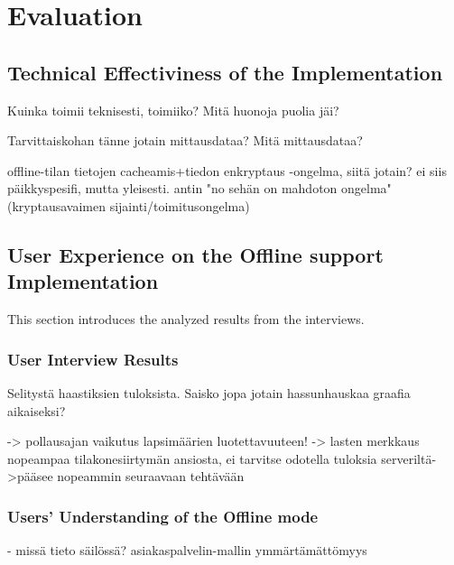 \chapter{Evaluation}


\section{Technical Effectiviness of the Implementation}


Kuinka toimii teknisesti, toimiiko? Mitä huonoja puolia jäi?

Tarvittaiskohan tänne jotain mittausdataa? Mitä mittausdataa?

offline-tilan tietojen cacheamis+tiedon enkryptaus -ongelma, siitä jotain? ei siis päikkyspesifi, mutta yleisesti. antin "no sehän on mahdoton ongelma" (kryptausavaimen sijainti/toimitusongelma)
 



\section{User Experience on the Offline support Implementation}

This section introduces the analyzed results from the interviews. 


\subsection{User Interview Results}
Selitystä haastiksien tuloksista. Saisko jopa jotain hassunhauskaa graafia aikaiseksi?

-> pollausajan vaikutus lapsimäärien luotettavuuteen!
-> lasten merkkaus nopeampaa tilakonesiirtymän ansiosta, ei tarvitse odotella tuloksia serveriltä->pääsee nopeammin seuraavaan tehtävään

\subsection{Users' Understanding of the Offline mode}
- missä tieto säilössä? asiakaspalvelin-mallin ymmärtämättömyys




